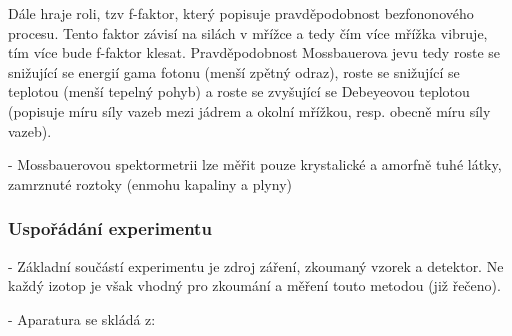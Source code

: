  
Dále hraje roli, tzv f-faktor, který popisuje pravděpodobnost bezfononového procesu. Tento faktor závisí na silách v mřížce a tedy čím více mřížka vibruje, tím více bude f-faktor klesat. Pravděpodobnost Mossbauerova jevu tedy roste se snižující se energií gama fotonu (menší zpětný odraz), roste se snižující se teplotou (menší tepelný pohyb) a roste se zvyšující se Debeyeovou teplotou (popisuje míru síly vazeb mezi jádrem a okolní mřížkou, resp. obecně míru síly vazeb).
 
 
 - Mossbauerovou spektormetrii lze měřit pouze krystalické a amorfně tuhé látky, zamrznuté roztoky (enmohu kapaliny a plyny)


\subsubsection{Uspořádání experimentu}
- Základní součástí experimentu je zdroj záření, zkoumaný vzorek a detektor. Ne každý izotop je však vhodný pro zkoumání a měření touto metodou (již řečeno).

- Aparatura se skládá z:

